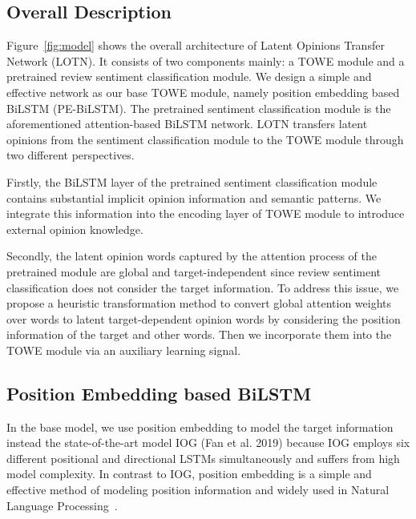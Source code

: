 \documentclass[letterpaper]{article} \usepackage{aaai20}  \usepackage{times}  \usepackage{helvet} \usepackage{courier}  \usepackage[hyphens]{url}  \usepackage{graphicx} \urlstyle{rm} \def\UrlFont{\rm}  \usepackage{graphicx}
\begin{document}
\subsection{Overall Description}
Figure~\ref{fig:model} shows the overall architecture of Latent Opinions Transfer Network (LOTN). It consists of two components mainly: a TOWE module and a pretrained review sentiment classification module. We design a simple and effective network as our base TOWE module,  namely position embedding based BiLSTM (PE-BiLSTM). The pretrained sentiment classification module is the aforementioned attention-based BiLSTM network. LOTN transfers latent opinions from the sentiment classification module to the TOWE module through two different perspectives.

Firstly, the BiLSTM layer of the pretrained sentiment classification module contains substantial implicit opinion information and semantic patterns. We integrate this information into the encoding layer of TOWE module to introduce external opinion knowledge.

Secondly, the latent opinion words captured by the attention process of the pretrained module are global and target-independent since review sentiment classification does not consider the target information. To address this issue, we propose a heuristic transformation method to convert global attention weights over words to latent target-dependent opinion words by considering the position information of the target and other words. Then we incorporate them into the TOWE module via an auxiliary learning signal.

\subsection{Position Embedding based BiLSTM}
In the base model, we use position embedding to model the target information instead the state-of-the-art model IOG (Fan et al. 2019) because IOG employs six different positional and directional LSTMs simultaneously and suffers from high model complexity. In contrast to IOG, position embedding is a simple and effective method of modeling position information and widely used in Natural Language Processing~\cite{DBLP:conf/acl/LinSLLS16,DBLP:conf/acl/GehringAGD17,DBLP:conf/nips/VaswaniSPUJGKP17,DBLP:conf/coling/GuZHS18}.
\end{document}
